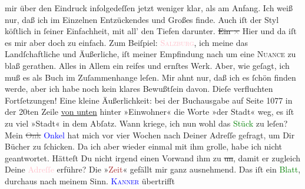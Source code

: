\documentclass[twoside=false,titlepage=false,open=any, parskip=never, fontsize=12pt, headings=small, chapterprefix=false, appendixprefix=false]{scrbook}
\newcommand{\strikeout}[1]{\sout{#1}}
\newcommand{\pbposition}{\depth}
\newcommand{\pb}{\nobreak\hspace{0pt}\raisebox{-0.1em}{\raisebox{\pbposition}{\textnormal{|}}}\nobreak\hspace{0pt}}
\begin{document}
               mir über den Eindruck infolgedeſſen jetzt weniger {\pb}klar, als am Anfang. Ich weiß nur, daß ich im Einzelnen Entzückendes und Großes
               finde. Auch iſt der Styl köſtlich in ſeiner Einfachheit, mit all’ den Tiefen
               darunter. \strikeout{Ein \textcolor{gray}{×}} Hier und da iſt es mir aber doch zu einfach. Zum Beiſpiel:
                  \textsc{\textcolor{pink}{Salzburg}{}\ledrightnote{\textcolor{pink}{Salzburg}}}, ich meine das
               Landſchaftliche und Äußerliche, iſt meiner Empfindung nach um eine \textsc{Nuance} zu blaß gerathen. Alles in Allem ein reifes und
               ernſtes Werk. Aber, wie geſagt, ich muß es als Buch im Zuſammenhange leſen. Mir ahnt
               nur, daß ich es ſchön finden werde, {\pb}aber ich habe
               noch kein klares Bewußtſein davon. Dieſe verfluchten Fortſetzungen! Eine kleine
               Äußerlichkeit: bei der Buchausgabe \label{K_mets_Goldmann_94-partII-5v}\label{K_mets_Goldmann_94-partII-5h} auf
               Seite 1077 in der 20ten Zeile \uline{von unten} hinter
               »Einwohner« die Worte »der Stadt« weg, es iſt zu viel »Stadt« in dem Abſatz.\pend
           \pstart
           Wann kriege, ich nun wohl das \textcolor{green}{Stück}{} zu leſen?\pend
           \pstart
           Mein \strikeout{\textcolor{gray}{Onk}}{ }\textcolor{blue}{Onkel}{} hat mich
               vor vier Wochen nach Deiner Adreſſe gefragt, um Dir Bücher zu ſchicken. Da ich aber
               wieder einmal mit ihm grolle, habe ich nicht geantwortet. Hätteſt Du nicht irgend
               einen Vorwand ihm zu \label{K_mets_Goldmann_94-partII-44v}\label{K_mets_Goldmann_94-partII-44h}{ }\strikeout{un}, damit er zugleich {\pb}Deine \textcolor{pink}{Adreſſe}{} erführe?\pend
           \pstart
           Die »\textcolor{brown}{Zeit}{}\ledrightnote{\textcolor{brown}{Die Zeit. Wiener Wochenschrift}}« gefällt mir ganz ausnehmend. Das iſt ein
                  \textcolor{green}{Blatt}{}, durchaus nach meinem
               Sinn. \textsc{\textcolor{blue}{Kanner}{}\ledrightnote{\textcolor{blue}{Heinrich Kanner}}} übertrifft
\end{document}
